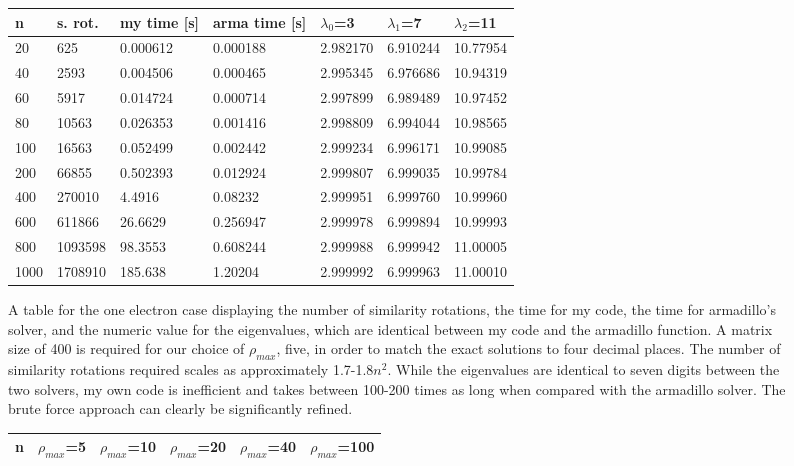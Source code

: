 \documentclass[11pt,a4paper]{article}
\begin{document}
{\begin{figure}
\centering
\begin{tabular}{| l | l | l | l | l | l | l |}
\hline
n  	 & s. rot. 	& my time [s] & arma time [s] & $\lambda_0$=3 & $\lambda_1$=7 & $\lambda_2$=11  \\ \hline
20   &  625     &  0.000612   &   0.000188 		& 2.982170 & 6.910244  & 10.77954 \\ \hline
40   &  2593    &  0.004506   &   0.000465 		& 2.995345 & 6.976686  & 10.94319 \\ \hline
60   &  5917    &  0.014724   &   0.000714		& 2.997899 & 6.989489  & 10.97452 \\ \hline
80   &  10563   &  0.026353   &   0.001416		& 2.998809 & 6.994044  & 10.98565 \\ \hline
100  &  16563   &  0.052499   &   0.002442		& 2.999234 & 6.996171  & 10.99085 \\ \hline
200  &  66855   &  0.502393   &   0.012924		& 2.999807 & 6.999035  & 10.99784 \\ \hline
400  &  270010  &  4.4916     &   0.08232		& 2.999951 & 6.999760  & 10.99960 \\ \hline
600  &  611866  &  26.6629    &   0.256947		& 2.999978 & 6.999894  & 10.99993 \\ \hline
800  &  1093598 &  98.3553    &   0.608244		& 2.999988 & 6.999942  & 11.00005 \\ \hline
1000 &  1708910 &  185.638    &   1.20204		& 2.999992 & 6.999963  & 11.00010 \\ \hline
\end{tabular}
\caption{A table for the one electron case displaying the number of similarity rotations, the time for my code, the time for armadillo's solver, and the numeric value for the eigenvalues, which are identical between my code and the armadillo function. A matrix size of 400 is required for our choice of $\rho_{max}$, five, in order to match the exact solutions to four decimal places. The number of similarity rotations required scales as approximately 1.7-1.8$n^2$. While the eigenvalues are identical to seven digits between the two solvers, my own code is inefficient and takes between 100-200 times as long when compared with the armadillo solver. The brute force approach can clearly be significantly refined.}
\end{figure}
\begin{figure}
\centering
\begin{tabular}{| l | l | l | l | l | l |}
\hline
n 	 & $\rho_{max}$=5 	&	$\rho_{max}$=10	&	$\rho_{max}$=20	&	$\rho_{max}$=40 & $\rho_{max}$=100 \\ \hline

\end{tabular}
\end{figure}}
\end{document}
